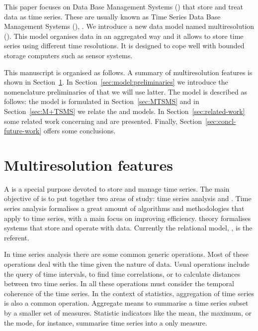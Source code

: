 
This paper focuses on Data Base Management Systems () that
store and treat data as time series. These are usually known as Time
Series Data Base Management Systems (), \cite{dreyer94}.
We introduce a new data model named multiresolution 
(). This model organises data in an aggregated way and it
allows to store time series using different time resolutions. It is
designed to cope well with bounded storage computers such as sensor
systems.




This manuscript is organised as follows.  A summary of multiresolution
features is shown in Section~\ref{sec:features}. In
Section~\ref{sec:model:preliminaries} we introduce the nomenclature
preliminaries of  that we will use latter. The 
model is described as follows: the model is formulated in
Section~\ref{sec:MTSMS} and in Section~\ref{sec:M+TSMS} we relate the
 and  models.
In Section~\ref{sec:related-work} some related work concerning
 and  are presented. Finally,
Section~\ref{sec:concl-future-work} offers some conclusions.



\section{Multiresolution features}
\label{sec:features}

A  is a special purpose  devoted to store and
manage time series.  The main objective of  is to put
together two areas of study: time series analysis and .
Time series analysis formalises a great amount of algorithms and
methodologies that apply to time series, with a main focus on
improving efficiency.  theory formalises systems that store
and operate with data. Currently the relational model,
\cite{date:introduction}, is the referent.

In time series analysis there are some common
generic operations.  Most of these operations deal with the time given
the nature of data.  Usual operations include the query of time
intervals, to find time correlations, or to calculate distances
between two time series. In all these operations  must
consider the temporal coherence of the time series.  In the context of
statistics, aggregation of time series is also a common
operation. Aggregate means to summarise a time series subset by a
smaller set of measures. Statistic indicators like the mean, the
maximum, or the mode, for instance, summarise time series into a only
measure.

